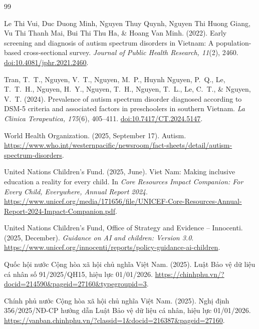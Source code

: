 \documentclass[11pt,a4paper]{article}
\begin{document}
\begin{thebibliography}{99}
\footnotesize
\setlength{\itemsep}{1pt}
\setlength{\parskip}{0pt}
\setlength{\parsep}{0pt}

Le Thi Vui, Duc Duong Minh, Nguyen Thuy Quynh, Nguyen Thi Huong Giang,
Vu Thi Thanh Mai, Bui Thi Thu Ha, \& Hoang Van Minh.
(2022).
\newblock Early screening and diagnosis of autism spectrum disorders in Vietnam:
A population-based cross-sectional survey.
\newblock \emph{Journal of Public Health Research, 11}(2), 2460.
\newblock \href{https://doi.org/10.4081/jphr.2021.2460}{doi:10.4081/jphr.2021.2460}.

Tran, T.~T., Nguyen, V.~T., Nguyen, M.~P., Huynh Nguyen, P.~Q., Le, T.~T.~H.,
Nguyen, H.~Y., Nguyen, T.~H., Nguyen, T.~L., Le, C.~T., \& Nguyen, V.~T.
(2024).
\newblock Prevalence of autism spectrum disorder diagnosed according to DSM-5
criteria and associated factors in preschoolers in southern Vietnam.
\newblock \emph{La Clinica Terapeutica, 175}(6), 405--411.
\newblock \href{https://doi.org/10.7417/CT.2024.5147}{doi:10.7417/CT.2024.5147}.

World Health Organization.
(2025, September 17).
\newblock Autism.
\newblock \url{https://www.who.int/westernpacific/newsroom/fact-sheets/detail/autism-spectrum-disorders}.

United Nations Children's Fund.
(2025, June).
\newblock Viet Nam: Making inclusive education a reality for every child.
\newblock In \emph{Core Resources Impact Companion: For Every Child, Everywhere,
Annual Report 2024}.
\newblock \url{https://www.unicef.org/media/171656/file/UNICEF-Core-Resources-Annual-Report-2024-Impact-Companion.pdf}.

United Nations Children's Fund, Office of Strategy and Evidence -- Innocenti.
(2025, December).
\newblock \emph{Guidance on AI and children: Version 3.0}.
\newblock \url{https://www.unicef.org/innocenti/reports/policy-guidance-ai-children}.

Quốc hội nước Cộng hòa xã hội chủ nghĩa Việt Nam.
(2025).
\newblock Luật Bảo vệ dữ liệu cá nhân số 91/2025/QH15, hiệu lực 01/01/2026.
\newblock \url{https://chinhphu.vn/?docid=214590&pageid=27160&typegroupid=3}.

Chính phủ nước Cộng hòa xã hội chủ nghĩa Việt Nam.
(2025).
\newblock Nghị định 356/2025/NĐ-CP hướng dẫn Luật Bảo vệ dữ liệu cá nhân,
hiệu lực 01/01/2026.
\newblock \url{https://vanban.chinhphu.vn/?classid=1&docid=216387&pageid=27160}.


\end{thebibliography}
\end{document}
